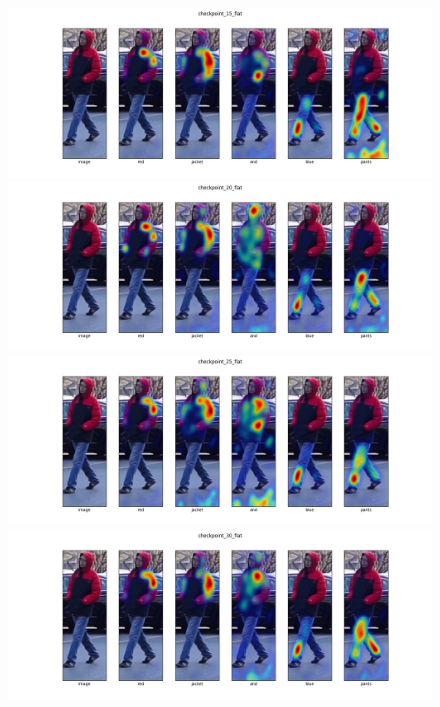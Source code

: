 \begin{figure}
  \includegraphics[width=\linewidth]{img/mrtd_masking_ratio/mrtd-checkpoint_15_flat.png}
  \includegraphics[width=\linewidth]{img/mrtd_masking_ratio/mrtd-checkpoint_20_flat.png}
  \includegraphics[width=\linewidth]{img/mrtd_masking_ratio/mrtd-checkpoint_25_flat.png}
  \includegraphics[width=\linewidth]{img/mrtd_masking_ratio/mrtd-checkpoint_30_flat.png}

\end{figure}
